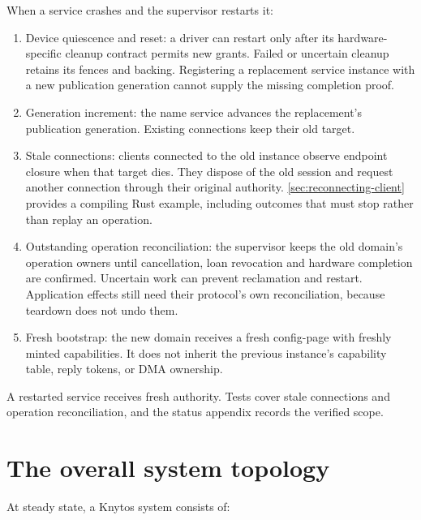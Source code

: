 When a service crashes and the supervisor restarts it:

\begin{enumerate}
    \item Device quiescence and reset: a driver can restart only after its
        hardware-specific cleanup contract permits new grants. Failed or
        uncertain cleanup retains its fences and backing. Registering a replacement
        service instance with a new publication generation cannot supply the
        missing completion proof.
    \item Generation increment: the name service advances the replacement's
        publication generation. Existing connections keep their old target.
    \item Stale connections: clients connected to the old instance
        observe endpoint closure when that target dies. They dispose of the old
        session and request another connection through their original authority.
        \autoref{sec:reconnecting-client} provides a compiling Rust example,
        including outcomes that must stop rather than replay an operation.
    \item Outstanding operation reconciliation: the supervisor
        keeps the old domain's operation owners until cancellation, loan
        revocation and hardware completion are confirmed. Uncertain work can
        prevent reclamation and restart. Application effects still need their
        protocol's own reconciliation, because teardown does not undo them.
    \item Fresh bootstrap: the new domain receives a fresh config-page
        with freshly minted capabilities. It does not inherit the previous
        instance's capability table, reply tokens, or DMA ownership.
\end{enumerate}

A restarted service receives fresh authority. Tests cover stale connections and
operation reconciliation, and the status appendix records the verified scope.

\section{The overall system topology}

At steady state, a Knytos system consists of:


